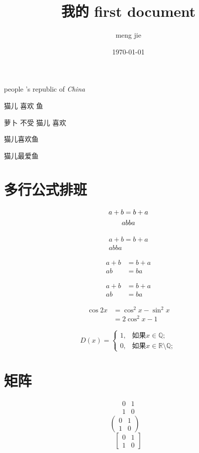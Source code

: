 \documentclass[10pt]{ctexart}%
\title{\heiti 我的 first document}
\author{meng jie}
\date{\today}
\newcommand\PRC{people 's republic of \emph{China}}%
\newcommand\hateby[2]{#2 不受 #1 喜欢}
\newcommand\loves[2]{#1 喜欢 #2}
\newcommand\love[3][喜欢]{#2#1#3}
\begin{document}
	\PRC
	
	\loves{猫儿}{鱼}
	
	\hateby{猫儿}{萝卜}
	
	\love{猫儿}{鱼}
	
	\love[最爱]{猫儿}{鱼}
	
	\section{多行公式排班}
	\begin{gather}
		a+b=b+a\notag \\%
		ab ba
	\end{gather}
	
	\begin{gather*}
	a+b=b+a\\
	ab ba
	\end{gather*}
	
	\begin{align}%
	a+b &=b+a\\
	ab  &= ba
	\end{align}
	
	\begin{align*}
	a+b&=b+a\\
	ab&= ba
	\end{align*}
	
	\begin{equation}
		\begin{split}
		\cos 2x&= \cos^2 x- \sin^2 x \\
		&= 2\cos^2 x - 1
		\end{split}
	\end{equation}
	
	\begin{equation}
		D(x)=\begin{cases}
		1,& \text{如果} x \in \mathbb{Q};\\
		0,& \text{如果} x \in \mathbb{R}\setminus\mathbb{Q};
		\end{cases}
	\end{equation}
	
	\section{矩阵}
	
	\[
	\begin{matrix}
		0 & 1 \\
		1 & 0 
	\end{matrix}
	\] \quad
	\[
	 \begin{pmatrix}
	 	0 & 1 \\
	 	1 & 0
	 \end{pmatrix}\quad\]
 	\[
 	\begin{bmatrix}
 		0 & 1 \\
 		1 & 0
 	\end{bmatrix}
 	\]
 	
\end{document}
